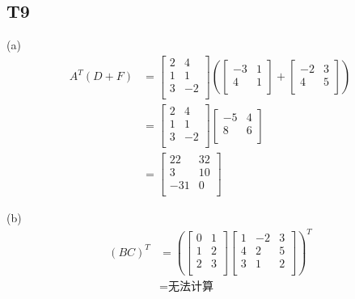\documentclass{article}
\begin{document}
\subsection{T9}
(a)
\begin{align*}
    A^T(D+F) &=
    \begin{bmatrix}
        2 & 4\\
        1 & 1\\
        3 & -2\\
    \end{bmatrix}
    \left(
    \begin{bmatrix}
        -3 & 1\\
        4 & 1\\
    \end{bmatrix}
    +
    \begin{bmatrix}
        -2 & 3\\
        4 & 5\\
    \end{bmatrix}
    \right)\\
    &=
    \begin{bmatrix}
        2 & 4\\
        1 & 1\\
        3 & -2\\
    \end{bmatrix}
    \begin{bmatrix}
        -5 & 4\\
        8 & 6\\
    \end{bmatrix}\\
    &=
    \begin{bmatrix}
        22 & 32\\
        3 & 10\\
        -31 & 0\\
    \end{bmatrix}
\end{align*}

(b)
\begin{align*}
    (BC)^T &=
    \left(
    \begin{bmatrix}
        0 & 1\\
        1 & 2\\
        2 & 3\\
    \end{bmatrix}
    \begin{bmatrix}
        1 & -2 & 3\\
        4 & 2 & 5\\
        3 & 1 & 2\\
    \end{bmatrix}
    \right)^T\\
    &= \text{无法计算}
\end{align*}
\end{document}
